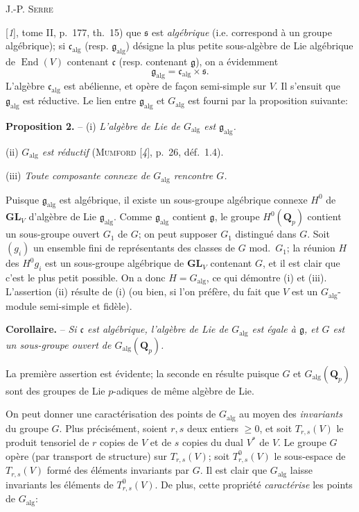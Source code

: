 \begin{center}\small J.-P. \textsc{Serre}\end{center}
[\textit{1}], tome II, p.~177, th.~15) que $\mathfrak{s}$ est \textit{algébrique} (i.e. correspond à un groupe algébrique); si $\mathfrak{c}_{\mathrm{alg}}$ (resp. $\mathfrak{g}_{\mathrm{alg}}$) désigne la plus petite sous-algèbre de Lie algébrique de $\operatorname{End}(V)$ contenant $\mathfrak{c}$ (resp. contenant $\mathfrak{g}$), on a évidemment
\[
\mathfrak{g}_{\mathrm{alg}}=\mathfrak{c}_{\mathrm{alg}}\times\mathfrak{s}.
\]
L’algèbre $\mathfrak{c}_{\mathrm{alg}}$ est abélienne, et opère de façon semi-simple sur $V$. Il s’ensuit que $\mathfrak{g}_{\mathrm{alg}}$ est réductive. Le lien entre $\mathfrak{g}_{\mathrm{alg}}$ et $G_{\mathrm{alg}}$ est fourni par la proposition suivante:

\textbf{Proposition 2.} -- (i) \textit{L’algèbre de Lie de $G_{\mathrm{alg}}$ est $\mathfrak{g}_{\mathrm{alg}}$.}

(ii) \textit{$G_{\mathrm{alg}}$ est réductif} (\textsc{Mumford} [\textit{4}], p.~26, déf.~1.4).

(iii) \textit{Toute composante connexe de $G_{\mathrm{alg}}$ rencontre $G$.}

Puisque $\mathfrak{g}_{\mathrm{alg}}$ est algébrique, il existe un sous-groupe algébrique connexe $H^0$ de $\mathbf{GL}_V$ d’algèbre de Lie $\mathfrak{g}_{\mathrm{alg}}$. Comme $\mathfrak{g}_{\mathrm{alg}}$ contient $\mathfrak{g}$, le groupe $H^0(\mathbf{Q}_p)$ contient un sous-groupe ouvert $G_1$ de $G$; on peut supposer $G_1$ distingué dans $G$. Soit $(g_i)$ un ensemble fini de représentants des classes de $G$ mod.~$G_1$; la réunion $H$ des $H^0g_i$ est un sous-groupe algébrique de $\mathbf{GL}_V$ contenant $G$, et il est clair que c’est le plus petit possible. On a donc $H=G_{\mathrm{alg}}$, ce qui démontre (i) et (iii). L’assertion (ii) résulte de (i) (ou bien, si l’on préfère, du fait que $V$ est un $G_{\mathrm{alg}}$-module semi-simple et fidèle).

\textbf{Corollaire.} -- \textit{Si $\mathfrak{c}$ est algébrique, l’algèbre de Lie de $G_{\mathrm{alg}}$ est égale à $\mathfrak{g}$, et $G$ est un sous-groupe ouvert de $G_{\mathrm{alg}}(\mathbf{Q}_p)$.}

La première assertion est évidente; la seconde en résulte puisque $G$ et $G_{\mathrm{alg}}(\mathbf{Q}_p)$ sont des groupes de Lie $p$-adiques de même algèbre de Lie.

On peut donner une caractérisation des points de $G_{\mathrm{alg}}$ au moyen des \textit{invariants} du groupe $G$. Plus précisément, soient $r,s$ deux entiers $\geqslant 0$, et soit $T_{r,s}(V)$ le produit tensoriel de $r$ copies de $V$ et de $s$ copies du dual $V^*$ de $V$. Le groupe $G$ opère (par transport de structure) sur $T_{r,s}(V)$; soit $T^0_{r,s}(V)$ le sous-espace de $T_{r,s}(V)$ formé des éléments invariants par $G$. Il est clair que $G_{\mathrm{alg}}$ laisse invariants les éléments de $T^0_{r,s}(V)$. De plus, cette propriété \textit{caractérise} les points de $G_{\mathrm{alg}}$:

